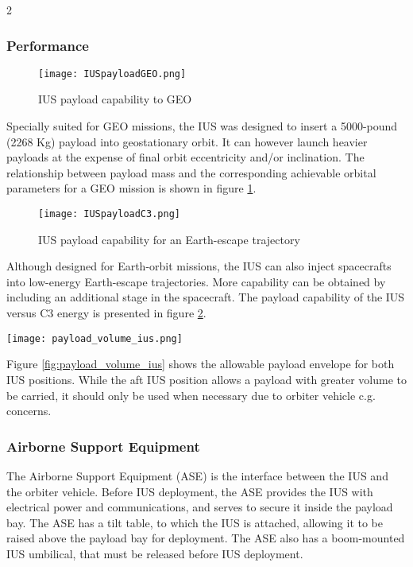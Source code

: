 \documentclass[Space_Shuttle_Ultra_Manual.tex]{subfiles}
\begin{document}
\begin{multicols*}{2}
\subsubsection{Performance}
\begin{figure}[H]
	\centering
	\captionsetup{justification=centering}
  \texttt{[image: IUSpayloadGEO.png]}
  \caption{IUS payload capability to GEO}
  \label{fig:IUSpayloadGEO}
\end{figure}
\noindent
Specially suited for GEO missions, the IUS was designed to insert a 5000-pound (2268 Kg) payload into geostationary orbit. It can however launch heavier payloads at the expense of final orbit eccentricity and/or inclination. The relationship between payload mass and the corresponding achievable orbital parameters for a GEO mission is shown in figure \ref{fig:IUSpayloadGEO}.\\

\begin{figure}[H]
	\centering
	\captionsetup{justification=centering}
  \texttt{[image: IUSpayloadC3.png]}
  \caption{IUS payload capability for an Earth-escape trajectory}
  \label{fig:IUSpayloadC3}
\end{figure}
\noindent
Although designed for Earth-orbit missions, the IUS can also inject spacecrafts into low-energy Earth-escape trajectories. More capability can be obtained by including an additional stage in the spacecraft. The payload capability of the IUS versus C3 energy is presented in figure \ref{fig:IUSpayloadC3}.

\begin{figure*}[t!]
  \centering
  \texttt{[image: payload\_volume\_ius.png]}
  \caption{IUS payload envelope (dimensions in meters)}
  \label{fig:payload_volume_ius}
\end{figure*}
\noindent
Figure \ref{fig:payload_volume_ius} shows the allowable payload envelope for both IUS positions. While the aft IUS position allows a payload with greater volume to be carried, it should only be used when necessary due to orbiter vehicle c.g. concerns.

\subsubsection{Airborne Support Equipment}
The Airborne Support Equipment (ASE) is the interface between the IUS and the orbiter vehicle. Before IUS deployment, the ASE provides the IUS with electrical power and communications, and serves to secure it inside the payload bay. The ASE has a tilt table, to which the IUS is attached, allowing it to be raised above the payload bay for deployment. The ASE also has a boom-mounted IUS umbilical, that must be released before IUS deployment.


\end{multicols*}
\end{document}
